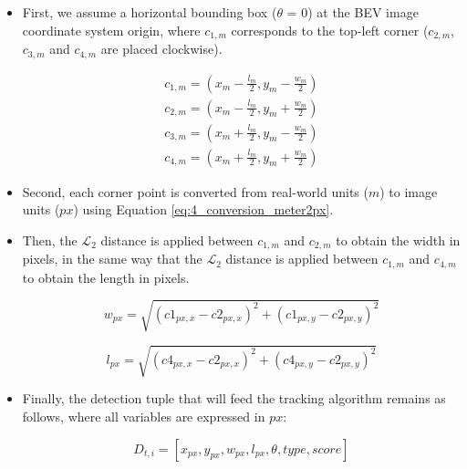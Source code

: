 \begin{itemize}
	\item First, we assume a horizontal bounding box ($\theta$ = 0) at the \ac{BEV} image coordinate system origin, where \textit{$c_{1,m}$} corresponds to the top-left corner (\textit{$c_{2,m}$}, \textit{$c_{3,m}$} and \textit{$c_{4,m}$} are placed clockwise).
	
	\begin{equation}
		\begin{split}
			c_{1,m} = (x_{m}-\frac{l_{m}}{2},y_{m}-\frac{w_{m}}{2}) \\
			c_{2,m} = (x_{m}-\frac{l_{m}}{2},y_{m}+\frac{w_{m}}{2}) \\
			c_{3,m} = (x_{m}+\frac{l_{m}}{2},y_{m}-\frac{w_{m}}{2}) \\
			c_{4,m} = (x_{m}+\frac{l_{m}}{2},y_{m}+\frac{w_{m}}{2}) 
		\end{split}
	\end{equation}
	
	\item Second, each corner point is converted from real-world units ($m$) to image units ($px$) using Equation \ref{eq:4_conversion_meter2px}.
	
	\item Then, the $\mathcal{L}_2$ distance is applied between \textit{$c_{1,m}$} and \textit{$c_{2,m}$} to obtain the width in pixels, in the same way that the $\mathcal{L}_2$ distance is applied between \textit{$c_{1,m}$} and \textit{$c_{4,m}$} to obtain the length in pixels.
	
	\begin{equation}
		\label{widthpixels}
		w_{px} = \sqrt{(c1_{px,x}-c2_{px,x})^2 + (c1_{px,y}-c2_{px,y})^2}
	\end{equation}
	
	\begin{equation}
		\label{lengthpixels}
		l_{px} = \sqrt{(c4_{px,x}-c2_{px,x})^2 + (c4_{px,y}-c2_{px,y})^2}
	\end{equation}
	
	\item Finally, the detection tuple that will feed the tracking algorithm remains as follows, where all variables are expressed in $px$:
	
	\begin{equation}
		\label{detpx}
		D_{t,i} = [x_{px},y_{px},w_{px},l_{px},\theta,type,score]
	\end{equation}
	
\end{itemize}

